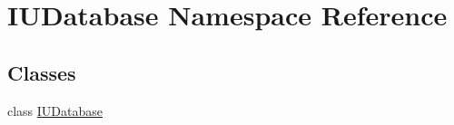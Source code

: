 \hypertarget{namespace_i_u_database}{\section{I\-U\-Database Namespace Reference}
\label{namespace_i_u_database}
}
\subsection*{Classes}
\begin{DoxyCompactItemize}
\item 
class \hyperlink{class_i_u_database_1_1_i_u_database}{I\-U\-Database}
\end{DoxyCompactItemize}
